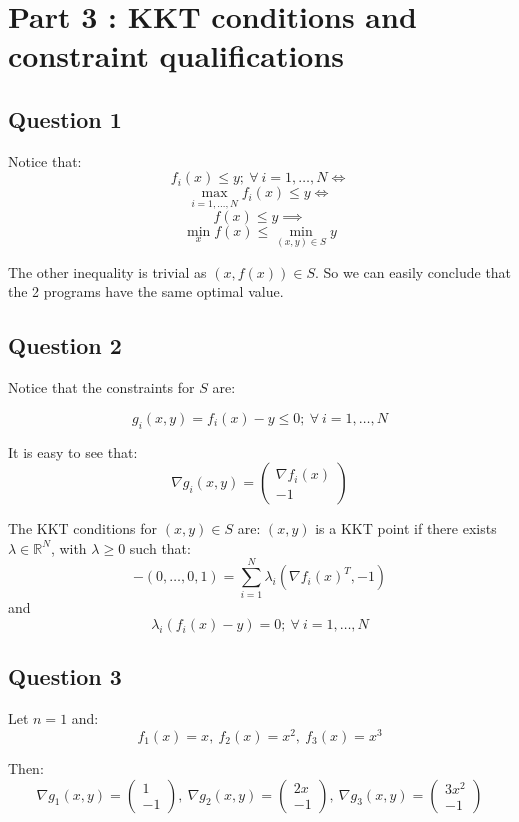 \documentclass[12p]{article}
\begin{document}
\newpage

\section*{Part 3 : KKT conditions and constraint qualifications}

\subsection*{Question 1}\hfil\par
Notice that:
\[f_i(x)\leq y;\ \forall \ i=1,\dots,N\iff\]
\[\max_{i=1,\dots,N}f_i(x)\leq y\iff \]
\[f(x)\leq y \implies \]
\[\min_xf(x)\leq\min_{(x,y)\in S}y\]

The other inequality is trivial as \((x,f(x))\in S\). So we can easily conclude that the 2 programs have the same optimal value.

\subsection*{Question 2}\hfil\par
Notice that the constraints for \(S\) are:

\[
    g_i(x,y)=f_i(x)-y\leq 0;\ \forall \ i=1,\dots,N
\]

It is easy to see that:
\[
    \nabla g_i(x,y)=\begin{pmatrix}
    \nabla f_i(x)\\
     -1
    \end{pmatrix}    
\]

The KKT conditions for \((x,y)\in S\) are: \((x,y)\) is a KKT point if there exists \(\lambda\in\mathbb{R}^N\), with \(\lambda\geq0\) such that:
\[
    -(0,\dots,0,1)=   \sum_{i=1}^{N}\lambda_i(\nabla f_i(x)^T,-1)    
\]
and
\[
    \lambda_i(f_i(x)-y)=0;\ \forall\ i=1,\dots,N  
\]
\subsection*{Question 3}\hfil\par
Let \(n=1\) and:
\[
    f_1(x)=x,\ f_2(x)=x^2,\ f_3(x)=x^3
\]

Then:
\[
  \nabla g_1(x,y)=\begin{pmatrix}
    1\\
     -1
    \end{pmatrix},\ \nabla g_2(x,y)=\begin{pmatrix}
    2x\\
     -1
    \end{pmatrix},\ \nabla g_3(x,y)=\begin{pmatrix}
    3x^2\\
     -1
    \end{pmatrix}
\]
\end{document}
